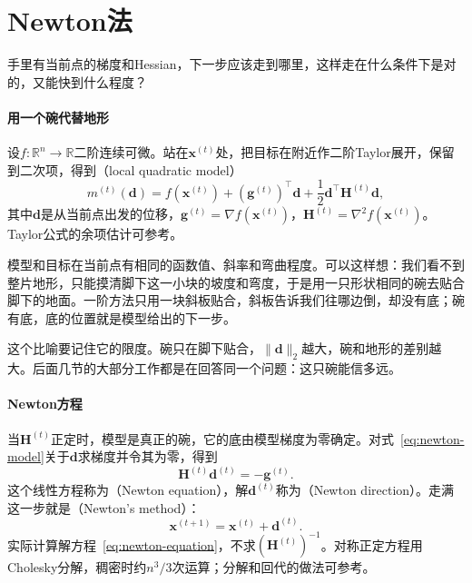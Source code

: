 \section{Newton法}
\label{sec:newton-basic}

手里有当前点的梯度和Hessian，下一步应该走到哪里，这样走在什么条件下是对的，又能快到什么程度？

\paragraph{用一个碗代替地形}
设$f:\mathbb{R}^n\to\mathbb{R}$二阶连续可微。站在$\bm{x}^{(t)}$处，把目标在附近作二阶Taylor展开，保留到二次项，得到（local quadratic model）
\begin{equation}
 m^{(t)}(\bm{d})=f(\bm{x}^{(t)})+(\bm{g}^{(t)})^\top\bm{d}+\frac12\bm{d}^\top\bm{H}^{(t)}\bm{d},
 \label{eq:newton-model}
\end{equation}
其中$\bm{d}$是从当前点出发的位移，$\bm{g}^{(t)}=\nabla f(\bm{x}^{(t)})$，$\bm{H}^{(t)}=\nabla^2f(\bm{x}^{(t)})$。Taylor公式的余项估计可参考。

模型和目标在当前点有相同的函数值、斜率和弯曲程度。可以这样想：我们看不到整片地形，只能摸清脚下这一小块的坡度和弯度，于是用一只形状相同的碗去贴合脚下的地面。一阶方法只用一块斜板贴合，斜板告诉我们往哪边倒，却没有底；碗有底，底的位置就是模型给出的下一步。

这个比喻要记住它的限度。碗只在脚下贴合，$\lVert\bm{d}\rVert_2$越大，碗和地形的差别越大。后面几节的大部分工作都是在回答同一个问题：这只碗能信多远。

\paragraph{Newton方程}
当$\bm{H}^{(t)}$正定时，模型是真正的碗，它的底由模型梯度为零确定。对式~\eqref{eq:newton-model}关于$\bm{d}$求梯度并令其为零，得到
\begin{equation}
 \bm{H}^{(t)}\bm{d}^{(t)}=-\bm{g}^{(t)}.
 \label{eq:newton-equation}
\end{equation}
这个线性方程称为（Newton equation），解$\bm{d}^{(t)}$称为（Newton direction）。走满这一步就是（Newton's method）：
\begin{equation}
 \bm{x}^{(t+1)}=\bm{x}^{(t)}+\bm{d}^{(t)}.
 \label{eq:newton-update}
\end{equation}
实际计算解方程~\eqref{eq:newton-equation}，不求$(\bm{H}^{(t)})^{-1}$。对称正定方程用Cholesky分解，稠密时约$n^3/3$次运算；分解和回代的做法可参考。

